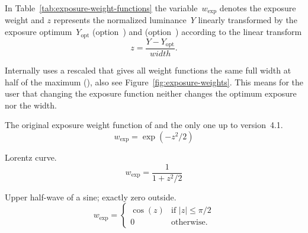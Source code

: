\begin{codelist}
  In Table~\ref{tab:exposure-weight-functions} the
  variable~$w_{\mathrm{exp}}$ denotes the exposure weight and $z$
  represents the normalized luminance~$Y$ linearly transformed by the
  exposure optimum~$Y_{\mathrm{opt}}$
  (option~) and 
  (option~) according to the linear
  transform
  \[
  z = \frac{Y - Y_{\mathrm{opt}}}{\mathit{width}}.
  \]

  Internally \App{} uses a rescaled  that gives all
  weight functions the same full width
  at half of the maximum
  (),
  also see Figure~\ref{fig:exposure-weights}.  This means for the user
  that changing the exposure function neither changes the optimum
  exposure nor the width.

  \begin{table}[htbp]
    \begin{codelist}
    \item[\itempar{gauss \\ gaussian}]\itemend The original exposure
      weight function of \App{} and the only one up to version~4.1.
      \begin{equation}\label{equ:weight:gauss}
      w_{\mathrm{exp}} = \exp\left({-z^2 / 2}\right)
      \end{equation}

    \item[\itempar{lorentz \\ lorentzian}]\itemend Lorentz curve.
      \begin{equation}\label{equ:weight:lorentz}
      w_{\mathrm{exp}} = \frac{1}{1 + z^2 / 2}
      \end{equation}

    \item[\itempar{halfsine \\ half-sine}]\itemend Upper half-wave of
      a sine; exactly zero outside.
      \begin{equation}\label{equ:weight:halfsine}
      w_{\mathrm{exp}} =
      \left\{\begin{array}{cl}
      \cos(z) & \mbox{if } |z| \leq \pi/2 \\
      0       & \mbox{otherwise.}
      \end{array}\right.
      \end{equation}


\end{codelist}
\end{table}
\end{codelist}
